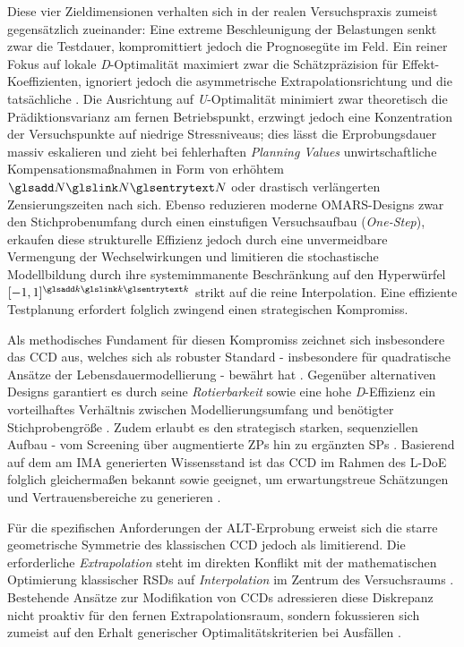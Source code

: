 Diese vier Zieldimensionen verhalten sich in der realen Versuchspraxis zumeist gegensätzlich zueinander:
Eine extreme Beschleunigung der Belastungen senkt zwar die Testdauer, kompromittiert jedoch die Prognosegüte im Feld.
Ein reiner Fokus auf lokale \textit{D}-Optimalität maximiert zwar die Schätzpräzision für Effekt-Koeffizienten, ignoriert jedoch die asymmetrische Extrapolationsrichtung und die tatsächliche .
Die Ausrichtung auf \textit{U}-Optimalität minimiert zwar theoretisch die Prädiktionsvarianz am fernen Betriebspunkt, erzwingt jedoch eine Konzentration der Versuchspunkte auf niedrige Stressniveaus; dies lässt die Erprobungsdauer massiv eskalieren und zieht bei fehlerhaften \textit{Planning Values} unwirtschaftliche Kompensationsmaßnahmen in Form von erhöhtem $\sym{N}$ oder drastisch verlängerten Zensierungszeiten nach sich.
Ebenso reduzieren moderne \ac{OMARS}-Designs zwar den Stichprobenumfang durch einen einstufigen Versuchsaufbau (\textit{One-Step}), erkaufen diese strukturelle Effizienz jedoch durch eine unvermeidbare Vermengung der Wechselwirkungen und limitieren die stochastische Modellbildung durch ihre systemimmanente Beschränkung auf den Hyperwürfel $[-1, 1]^{\sym{k}}$ strikt auf die reine Interpolation.
Eine effiziente Testplanung erfordert folglich zwingend einen strategischen Kompromiss.

Als methodisches Fundament für diesen Kompromiss zeichnet sich insbesondere das \ac{CCD} aus, welches sich als robuster Standard - insbesondere für quadratische Ansätze der Lebensdauermodellierung - bewährt hat \cite{Kleppmann.2020,Rigdon.2022,Kremer.2021}.
Gegenüber alternativen Designs garantiert es durch seine \textit{Rotierbarkeit} sowie eine hohe \textit{D}-Effizienz ein vorteilhaftes Verhältnis zwischen Modellierungsumfang und benötigter Stichprobengröße \cite{Rigdon.2022}.
Zudem erlaubt es den strategisch starken, sequenziellen Aufbau - vom Screening über augmentierte \acp{ZP} hin zu ergänzten \acp{SP} \cite{Montgomery.2020,Bisgaard.1992}.
Basierend auf dem am \ac{IMA} generierten Wissensstand \cite{Kremer.2021} ist das \ac{CCD} im Rahmen des \ac{L-DoE} folglich gleichermaßen bekannt sowie geeignet, um erwartungstreue Schätzungen und Vertrauensbereiche zu generieren \cite{Kremer.2019b, Kremer.2019c}.

Für die spezifischen Anforderungen der \ac{ALT}-Erprobung erweist sich die starre geometrische Symmetrie des klassischen \ac{CCD} jedoch als limitierend.
Die erforderliche \textit{Extrapolation} steht im direkten Konflikt mit der mathematischen Optimierung klassischer \acp{RSD} auf \textit{Interpolation} im Zentrum des Versuchsraums \cite{Box.1951}.
Bestehende Ansätze zur Modifikation von \acp{CCD} \cite{Ahn.2015, Donev.2004, Ardakani.2011} adressieren diese Diskrepanz nicht proaktiv für den fernen Extrapolationsraum, sondern fokussieren sich zumeist auf den Erhalt generischer Optimalitätskriterien bei Ausfällen \cite{Arndt.2022, Rittmaier.2025}.

